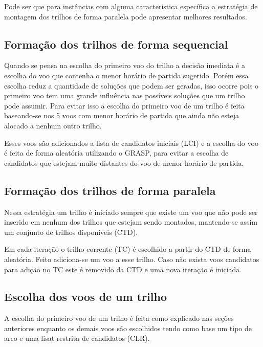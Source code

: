 Pode ser que para instâncias com alguma característica específica a
estratégia de montagem dos trilhos de forma paralela pode apresentar melhores
resultados.
  
\subsection{Formação dos trilhos de forma sequencial}

Quando se pensa na escolha do primeiro voo do trilho a decisão imediata é a
escolha do voo que contenha o menor horário de partida sugerido. Porém essa
escolha reduz a quantidade de soluções que podem ser geradas, isso ocorre pois o
primeiro voo tem uma grande influência nas possíveis soluções que um trilho pode
assumir. Para evitar isso a escolha do primeiro voo de um trilho é feita
baseando-se nos 5 voos com menor horário de partida que ainda não esteja
alocado a nenhum outro trilho. 

Esses voos são adicionados a lista de candidatos iniciais (LCI) e a escolha do
voo é feita de forma aleatória utilizando o GRASP, para evitar a escolha de
candidatos que estejam muito distantes do voo de menor horário de partida.

\subsection{Formação dos trilhos de forma paralela}
 
Nessa estratégia um trilho é iniciado sempre que existe um voo que não pode ser
inserido em nenhum dos trilhos que estejam sendo montados, mantendo-se assim um
conjunto de trilhos disponíveis (CTD).

Em cada iteração o trilho corrente (TC) é escolhido a partir do CTD de forma
aleatória. Feito adiciona-se um voo a esse trilho. Caso não exista voos
candidatos para adição no TC este é removido da CTD e uma nova iteração é
iniciada.
  
\subsection{Escolha dos voos de um trilho}

A escolha do primeiro voo de um trilho é feita como explicado nas seções
anteriores enquanto os demais voos são escolhidos tendo como base um tipo de
arco e uma lisat restrita de candidatos (CLR).
 
